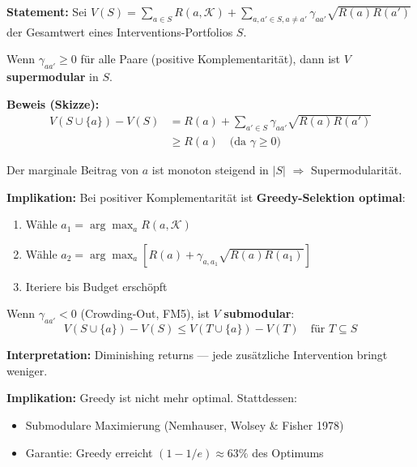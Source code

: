 \begin{tcolorbox}[colback=green!5!white, colframe=green!75!black,
    title=\textbf{Theorem HHH-T10: Supermodularität der Interventions-Komplementarität}]

\textbf{Statement:} Sei $V(S) = \sum_{a \in S} R(a, \mathcal{K}) + \sum_{a, a' \in S, a \neq a'} \gamma_{aa'} \sqrt{R(a) R(a')}$ der Gesamtwert eines Interventions-Portfolios $S$.

Wenn $\gamma_{aa'} \geq 0$ für alle Paare (positive Komplementarität), dann ist $V$ \textbf{supermodular} in $S$.

\textbf{Beweis (Skizze):}
\begin{align*}
V(S \cup \{a\}) - V(S) &= R(a) + \sum_{a' \in S} \gamma_{aa'} \sqrt{R(a) R(a')} \\
&\geq R(a) \quad \text{(da } \gamma \geq 0\text{)}
\end{align*}

Der marginale Beitrag von $a$ ist monoton steigend in $|S|$ $\Rightarrow$ Supermodularität.

\textbf{Implikation:} Bei positiver Komplementarität ist \textbf{Greedy-Selektion optimal}:
\begin{enumerate}[nosep]
    \item Wähle $a_1 = \arg\max_a R(a, \mathcal{K})$
    \item Wähle $a_2 = \arg\max_a [R(a) + \gamma_{a, a_1} \sqrt{R(a) R(a_1)}]$
    \item Iteriere bis Budget erschöpft
\end{enumerate}

\end{tcolorbox}

\begin{tcolorbox}[colback=red!5!white, colframe=red!75!black,
    title=\textbf{Warnung: Submodularität bei Crowding-Out}]

Wenn $\gamma_{aa'} < 0$ (Crowding-Out, FM5), ist $V$ \textbf{submodular}:
\begin{equation}
V(S \cup \{a\}) - V(S) \leq V(T \cup \{a\}) - V(T) \quad \text{für } T \subseteq S
\end{equation}

\textbf{Interpretation:} Diminishing returns --- jede zusätzliche Intervention bringt weniger.

\textbf{Implikation:} Greedy ist nicht mehr optimal. Stattdessen:
\begin{itemize}[nosep]
    \item Submodulare Maximierung (Nemhauser, Wolsey \& Fisher 1978)
    \item Garantie: Greedy erreicht $(1 - 1/e) \approx 63\%$ des Optimums
\end{itemize}

\end{tcolorbox}

